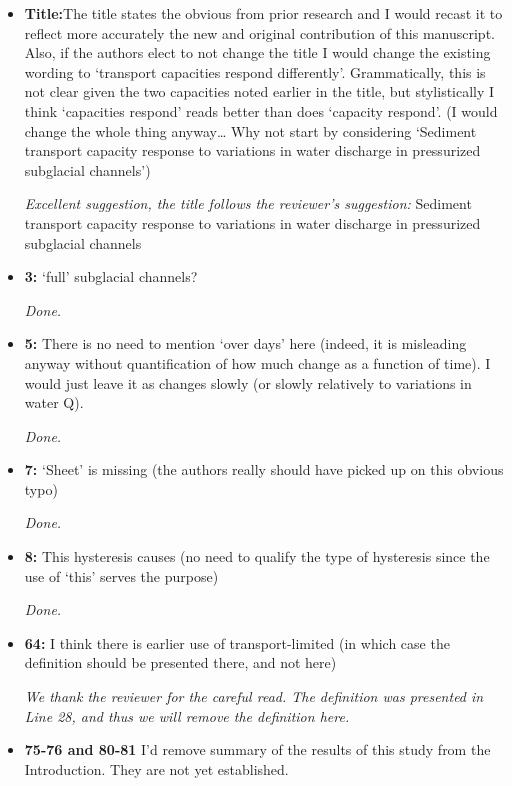 \documentclass[11pt]{article}
\begin{document}
\begin{itemize}
\item \textbf{Title:}The title states the obvious from prior research and I would recast it to
  reflect more accurately the new and original contribution of this
  manuscript. Also, if the authors elect to not change the title I would change
  the existing wording to ‘transport capacities respond differently’.
  Grammatically, this is not clear given the two capacities noted earlier in the
  title, but stylistically I think ‘capacities respond’ reads better than does
  ‘capacity respond’. (I would change the whole thing anyway… Why not start
  by considering ‘Sediment transport capacity response to variations in water
  discharge in pressurized subglacial channels’)

  \textit{Excellent suggestion, the title follows the reviewer's suggestion:} Sediment transport capacity response to variations in water discharge in pressurized subglacial channels
  
\item \textbf{3:} ‘full’ subglacial channels?

  \textit{Done.}
  
\item \textbf{5:} There is no need to mention ‘over days’ here (indeed, it is misleading
  anyway without quantification of how much change as a function of time).
  I would just leave it as changes slowly (or slowly relatively to variations in
  water Q).

  \textit{Done.}

\item \textbf{7:} ‘Sheet’ is missing (the authors really should have picked up on this obvious
  typo)

  \textit{Done.}

  
\item \textbf{8:} This hysteresis causes (no need to qualify the type of hysteresis since the
  use of ‘this’ serves the purpose)

  \textit{Done.}

  
\item \textbf{64:} I think there is earlier use of transport-limited (in which case the definition
  should be presented there, and not here)

  \textit{We thank the reviewer for the careful read. The definition was presented in Line 28, and thus we will remove the definition here.}


\item \textbf{75-76 and 80-81} I’d remove summary of the results of this study from the Introduction. They
  are not yet established.


\end{itemize}
\end{document}
